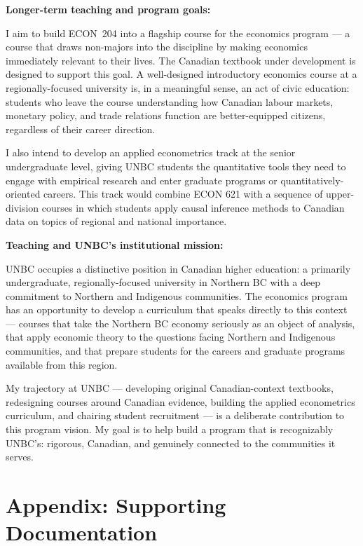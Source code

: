 \documentclass[11pt,letterpaper]{article}
\begin{document}
\textbf{Longer-term teaching and program goals:}

I aim to build ECON~204 into a flagship course for the economics program --- a course that draws non-majors into the discipline by making economics immediately relevant to their lives. The Canadian textbook under development is designed to support this goal. A well-designed introductory economics course at a regionally-focused university is, in a meaningful sense, an act of civic education: students who leave the course understanding how Canadian labour markets, monetary policy, and trade relations function are better-equipped citizens, regardless of their career direction.

I also intend to develop an applied econometrics track at the senior undergraduate level, giving UNBC students the quantitative tools they need to engage with empirical research and enter graduate programs or quantitatively-oriented careers. This track would combine ECON 621 with a sequence of upper-division courses in which students apply causal inference methods to Canadian data on topics of regional and national importance.

\textbf{Teaching and UNBC's institutional mission:}

UNBC occupies a distinctive position in Canadian higher education: a primarily undergraduate, regionally-focused university in Northern BC with a deep commitment to Northern and Indigenous communities. The economics program has an opportunity to develop a curriculum that speaks directly to this context --- courses that take the Northern BC economy seriously as an object of analysis, that apply economic theory to the questions facing Northern and Indigenous communities, and that prepare students for the careers and graduate programs available from this region.

My trajectory at UNBC --- developing original Canadian-context textbooks, redesigning courses around Canadian evidence, building the applied econometrics curriculum, and chairing student recruitment --- is a deliberate contribution to this program vision. My goal is to help build a program that is recognizably UNBC's: rigorous, Canadian, and genuinely connected to the communities it serves.

\section{Appendix: Supporting Documentation}
\end{document}

